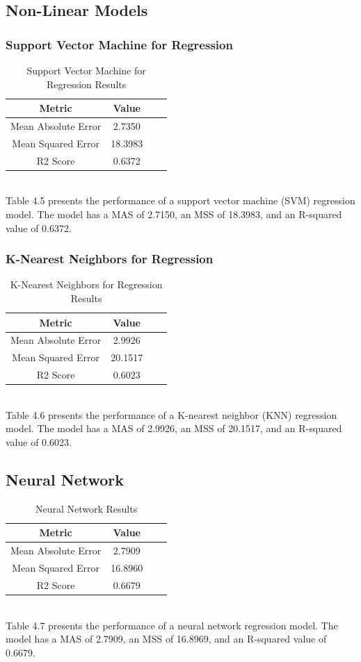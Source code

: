 \documentclass{report}
\begin{document}
\subsection{Non-Linear Models}
\subsubsection{Support Vector Machine for Regression}
\begin{table}[h]
\centering
\begin{tabular}{|c|c|c|c|}
\hline
\textbf{Metric} & \textbf{Value} \\ \hline
Mean Absolute Error & 2.7350 \\ \hline
Mean Squared Error & 18.3983 \\ \hline
R2 Score & 0.6372 \\ \hline
\end{tabular}
\caption{Support Vector Machine for Regression Results}
\end{table}
\hfill \break
\\
Table 4.5 presents the performance of a support vector machine (SVM) regression model. The model has a MAS of 2.7150, an MSS of 18.3983, and an R-squared value of 0.6372.
\subsubsection{K-Nearest Neighbors for Regression}
\begin{table}[h]
\centering
\begin{tabular}{|c|c|c|c|}
\hline
\textbf{Metric} & \textbf{Value} \\ \hline
Mean Absolute Error & 2.9926 \\ \hline
Mean Squared Error & 20.1517 \\ \hline
R2 Score & 0.6023 \\ \hline
\end{tabular}
\caption{K-Nearest Neighbors for Regression Results}
\end{table}
\hfill \break
\\
Table 4.6 presents the performance of a K-nearest neighbor (KNN) regression model. The model has a MAS of 2.9926, an MSS of 20.1517, and an R-squared value of 0.6023.
\subsection{Neural Network}
\begin{table}[h]
\centering
\begin{tabular}{|c|c|c|c|}
\hline
\textbf{Metric} & \textbf{Value} \\ \hline
Mean Absolute Error & 2.7909 \\ \hline
Mean Squared Error & 16.8960 \\ \hline
R2 Score &  0.6679 \\ \hline
\end{tabular}
\caption{Neural Network Results}
\end{table}
\hfill \break
\\
Table 4.7 presents the performance of a neural network regression model. The model has a MAS of 2.7909, an MSS of 16.8969, and an R-squared value of 0.6679.
\end{document}
